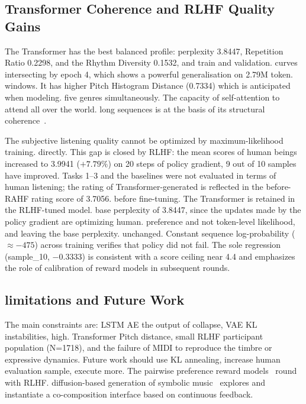 \documentclass[conference]{IEEEtran}
\begin{document}
\subsection{Transformer Coherence and RLHF Quality Gains}

The Transformer has the best balanced profile: perplexity 3.8447,
Repetition Ratio 0.2298, and the Rhythm Diversity 0.1532, and train and validation.
curves intersecting by epoch 4, which shows a powerful generalisation on 2.79M token.
windows. It has higher Pitch Histogram Distance (0.7334) which is anticipated when modeling.
five genres simultaneously. The capacity of self-attention to attend all over the world.
long sequences is at the basis of its structural coherence~\cite{vaswani2017attention}.

The subjective listening quality cannot be optimized by maximum-likelihood training.
directly. This gap is closed by RLHF: the mean scores of human beings increased to 3.9941 
($+7.79\%$) on 20 steps of policy gradient, 9 out of 10 samples have improved.
Tasks 1--3 and the baselines were not evaluated in terms of human listening;
the rating of Transformer-generated is reflected in the before-RAHF rating score of 3.7056.
before fine-tuning. The Transformer is retained in the RLHF-tuned model.
base perplexity of 3.8447, since the updates made by the policy gradient are optimizing human.
preference and not token-level likelihood, and leaving the base perplexity.
unchanged. Constant sequence log-probability  ($\approx -475$) across
training verifies that policy did not fail. The sole regression
(sample\_10, $-0.3333$) is consistent with a score ceiling near 4.4 and
emphasizes the role of calibration of reward models in subsequent rounds.

\subsection{limitations and Future Work}

The main constraints are: LSTM AE the output of collapse, VAE KL instabilities, high.
Transformer Pitch distance, small RLHF participant population (N=1718),
and the failure of MIDI to reproduce the timbre or expressive dynamics. Future work
should use KL annealing, increase human evaluation sample, execute more.
The pairwise preference reward models~\cite{christiano2017deep} round with RLHF.
diffusion-based generation of symbolic music~\cite{mittal2021symbolic} explores
and instantiate a co-composition interface based on continuous feedback.
\end{document}
